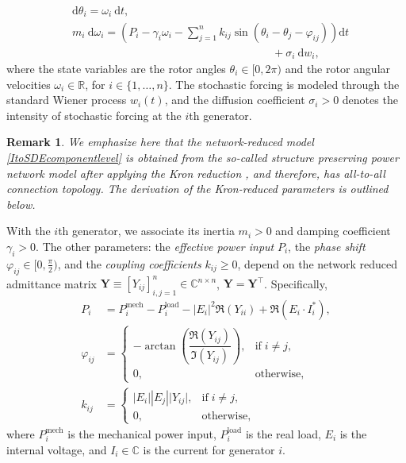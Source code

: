 \documentclass[10pt,twocolumn]{IEEEtran}
\newtheorem{remark}{Remark}
\begin{document}
\begin{subequations}
\begin{align}
&{\mathrm{d}}\theta_{i} = \omega_{i}\:{\mathrm{d}}t,\label{RotAngleGen}\\
&m_{i}\:{\mathrm{d}}\omega_{i} =	\left(\!P_{i} - \gamma_{i}\omega_{i} - \displaystyle\sum_{j=1}^{n} k_{ij}\sin\left(\theta_{i}-\theta_{j}-\varphi_{ij}\right)\!\right){\mathrm{d}}t \nonumber\\
&\qquad\qquad\qquad\qquad\qquad\qquad\qquad\qquad\qquad+\sigma_{i}\:{\mathrm{d}}w_{i},
\end{align}
\label{ItoSDEcomponentlevel}
\end{subequations}
where the state variables are the rotor angles $\theta_{i}\in[0,2\pi)$ and the rotor angular velocities $\omega_{i}\in\mathbb{R}$, for $i\in\{1,\hdots,n\}$. The stochastic forcing is modeled through the standard Wiener process $w_{i}(t)$, and the diffusion coefficient $\sigma_{i}>0$ denotes the intensity of stochastic forcing at the $i$th generator.
 
\begin{remark}
We emphasize here that the network-reduced model \eqref{ItoSDEcomponentlevel} is obtained from the so-called structure preserving power network model \cite{odun2012structure} after applying the Kron reduction \cite{dorfler2012kron}, and therefore, has all-to-all connection topology. The derivation of the Kron-reduced parameters is outlined below.
\end{remark}

With the $i$th generator, we associate its inertia $m_{i}>0$ and damping coefficient $\gamma_{i}>0$. The other parameters: the \emph{effective power input} $P_{i}$, the \emph{phase shift} $\varphi_{ij}\in[0,\frac{\pi}{2})$, and the \emph{coupling coefficients} $k_{ij}\geq 0$, depend on the network reduced admittance matrix $\bm{Y}\equiv[Y_{ij}]_{i,j=1}^{n}\in\mathbb{C}^{n\times n}$, $\bm{Y}=\bm{Y}^{\top}$. Specifically,
\begin{subequations}
\begin{align}
 P_{i} &= P_{i}^{\text{mech}} - P_{i}^{\text{load}} - |E_{i}|^{2} \Re\left(Y_{ii}\right) + \Re\left(E_i \cdot I_{i}^{*}\right),\label{defPi}\\
 \varphi_{ij} &= \begin{cases} -\arctan\left(\dfrac{\Re\left(Y_{ij}\right)}{\Im\left(Y_{ij}\right)}\right), & \text{if}\;i\neq j,\\
 0, & \text{otherwise},
 \end{cases}\\
 k_{ij} &= \begin{cases} |E_{i}| |E_{j}| \vert Y_{ij}\vert, & \text{if}\;i\neq j,\\
 0, & \text{otherwise},
 \end{cases}
\end{align}
\label{DefParam}
\end{subequations}
where $P_{i}^{\text{mech}}$ is the mechanical power input, $P_{i}^{\text{load}}$ is the real load, $E_{i}$ is the internal voltage, and $I_{i}\in\mathbb{C}$ is the current for generator $i$.
\end{document}
